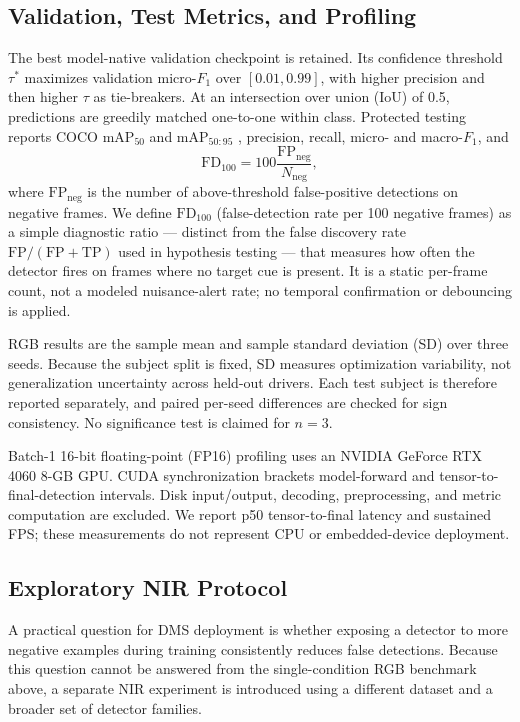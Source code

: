 \documentclass[conference]{IEEEtran}
\newcommand{\fd}{\mathrm{FD}_{100}}
\begin{document}
\subsection{Validation, Test Metrics, and Profiling}
The best model-native validation checkpoint is retained. Its confidence threshold $\tau^*$ maximizes validation micro-$F_1$ over $[0.01,0.99]$, with higher precision and then higher $\tau$ as tie-breakers. At an intersection over union (IoU) of 0.5, predictions are greedily matched one-to-one within class. Protected testing reports COCO $\mathrm{mAP}_{50}$ and $\mathrm{mAP}_{50:95}$ \cite{lin2014coco}, precision, recall, micro- and macro-$F_1$, and
\begin{equation}
\fd=100\frac{\mathrm{FP}_{\mathrm{neg}}}{N_{\mathrm{neg}}},
\end{equation}
where $\mathrm{FP}_{\mathrm{neg}}$ is the number of above-threshold false-positive detections on negative frames. We define $\fd$ (false-detection rate per 100 negative frames) as a simple diagnostic ratio --- distinct from the false discovery rate $\mathrm{FP}/(\mathrm{FP}+\mathrm{TP})$ used in hypothesis testing --- that measures how often the detector fires on frames where no target cue is present. It is a static per-frame count, not a modeled nuisance-alert rate; no temporal confirmation or debouncing is applied.

RGB results are the sample mean and sample standard deviation (SD) over three seeds. Because the subject split is fixed, SD measures optimization variability, not generalization uncertainty across held-out drivers. Each test subject is therefore reported separately, and paired per-seed differences are checked for sign consistency. No significance test is claimed for $n=3$.

Batch-1 16-bit floating-point (FP16) profiling uses an NVIDIA GeForce RTX 4060 8-GB GPU. CUDA synchronization brackets model-forward and tensor-to-final-detection intervals. Disk input/output, decoding, preprocessing, and metric computation are excluded. We report p50 tensor-to-final latency and sustained FPS; these measurements do not represent CPU or embedded-device deployment.

\subsection{Exploratory NIR Protocol}
A practical question for DMS deployment is whether exposing a detector to more negative examples during training consistently reduces false detections. Because this question cannot be answered from the single-condition RGB benchmark above, a separate NIR experiment is introduced using a different dataset and a broader set of detector families.
\end{document}
